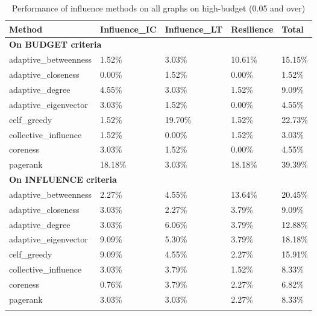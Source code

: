 \begin{longtable}[c]{|l|l|l|l|l|}
	\hline
	\textbf{Method} & \textbf{Influence\_IC} & \textbf{Influence\_LT} & \textbf{Resilience} & \textbf{Total} \\ \hline
	\endfirsthead
	\endhead
	\multicolumn{5}{|l|}{\textbf{On BUDGET criteria}}             \\ \hline
	adaptive\_betweenness & 1.52\%  & 3.03\%  & 10.61\% & 15.15\% \\ \hline
	adaptive\_closeness   & 0.00\%  & 1.52\%  & 0.00\%  & 1.52\%  \\ \hline
	adaptive\_degree      & 4.55\%  & 3.03\%  & 1.52\%  & 9.09\%  \\ \hline
	adaptive\_eigenvector & 3.03\%  & 1.52\%  & 0.00\%  & 4.55\%  \\ \hline
	celf\_greedy          & 1.52\%  & 19.70\% & 1.52\%  & 22.73\% \\ \hline
	collective\_influence & 1.52\%  & 0.00\%  & 1.52\%  & 3.03\%  \\ \hline
	coreness              & 3.03\%  & 1.52\%  & 0.00\%  & 4.55\%  \\ \hline
	pagerank              & 18.18\% & 3.03\%  & 18.18\% & 39.39\% \\ \hline
	\multicolumn{5}{|l|}{\textbf{On INFLUENCE criteria}}          \\ \hline
	adaptive\_betweenness & 2.27\%  & 4.55\%  & 13.64\% & 20.45\% \\ \hline
	adaptive\_closeness   & 3.03\%  & 2.27\%  & 3.79\%  & 9.09\%  \\ \hline
	adaptive\_degree      & 3.03\%  & 6.06\%  & 3.79\%  & 12.88\% \\ \hline
	adaptive\_eigenvector & 9.09\%  & 5.30\%  & 3.79\%  & 18.18\% \\ \hline
	celf\_greedy          & 9.09\%  & 4.55\%  & 2.27\%  & 15.91\% \\ \hline
	collective\_influence & 3.03\%  & 3.79\%  & 1.52\%  & 8.33\%  \\ \hline
	coreness              & 0.76\%  & 3.79\%  & 2.27\%  & 6.82\%  \\ \hline
	pagerank              & 3.03\%  & 3.03\%  & 2.27\%  & 8.33\%  \\ \hline
	\caption[IMine accuracy of influence methods on high budget]{Performance of influence methods on all graphs on high-budget (0.05 and over)}
	\label{tab:inf-best-max-budget}
\end{longtable}

